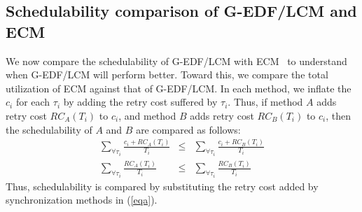 \documentclass[conference]{IEEEtran}
\begin{document}
\subsection{Schedulability comparison of G-EDF/LCM and ECM}
\label{performance g-edf-lcm}
We now compare the schedulability of G-EDF/LCM with ECM~\cite{stmconcurrencycontrol:emsoft11} %
to understand when G-EDF/LCM will perform better. 
Toward this, we compare the total utilization of ECM against that of G-EDF/LCM. In each method, we inflate the $c_i$ for each $\tau_i$ by adding the retry cost suffered by $\tau_i$. Thus, if method $A$ adds retry cost $RC_A(T_i)$ to $c_i$, and method $B$ adds retry cost $RC_B(T_i)$ to $c_i$, then the schedulability of $A$ and $B$ are compared as follows:
\begin{eqnarray}
\sum_{\forall \tau_{i}}\frac{c_{i}+RC_A(T_{i})}{T_{i}} & \le & \sum_{\forall \tau_{i}}\frac{c_{i}+RC_B(T_{i})}{T_{i}}\nonumber\\
\sum_{\forall \tau_{i}}\frac{RC_A(T_{i})}{T_{i}} & \le & \sum_{\forall \tau_{i}}\frac{RC_B(T_{i})}{T_{i}}
\label{eqa}\end{eqnarray}
Thus, schedulability is compared by substituting the retry cost added by synchronization methods in (\ref{eqa}).
\end{document}
